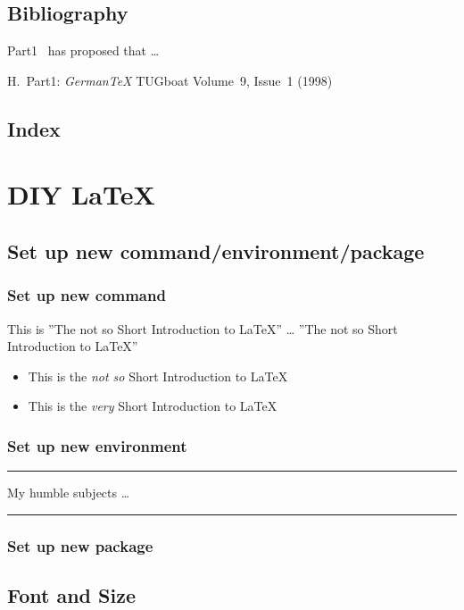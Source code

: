 \documentclass[a4paper,11pt]{article}
\begin{document}
\subsection{Bibliography}
Part1~\cite{pa} has
proposed that \ldots
\begin{thebibliography}{99}
     H.~Part1:
    \emph{German\TeX}
    TUGboat Volume~9, Issue~1 (1998)
\end{thebibliography}
\subsection{Index}
\section{DIY LaTeX}
\subsection{Set up new command/environment/package}
\subsubsection{Set up new command}
\newcommand{\tnss}{The not
so Short Introduction to \LaTeX}
This is ''\tnss'' \ldots{} ''\tnss''
\newcommand{\txsit}[1]
{
    This is the \emph{#1} Short
    Introduction to \LaTeX}
\begin{itemize}
    \item \txsit{not so}
    \item \txsit{very}
\end{itemize}

\subsubsection{Set up new environment}
\newenvironment{king}
{
    \rule{1ex}{1ex}%
    \hspace{\stretch{1}}
}
{
    \rule{1ex}{1ex}
}
\begin{king}
    My humble subjects \ldots
\end{king}
\subsubsection{Set up new package}
\subsection{Font and Size}
\end{document}
